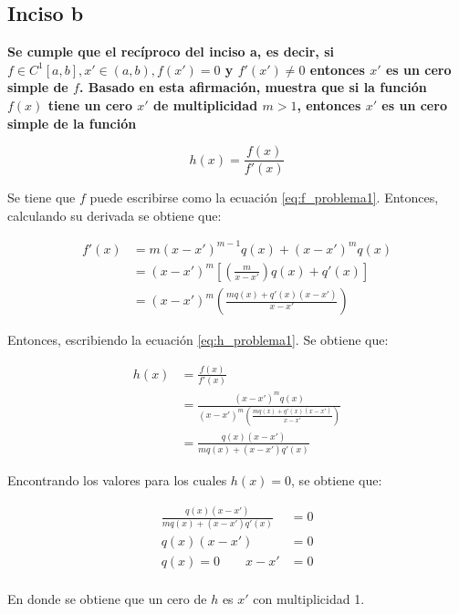 \subsection*{Inciso b}

\textbf{Se cumple que el recíproco del inciso a, es decir, si $f\in C^1[a,b], x' \in (a,b), f(x')=0$ y $f'(x')\neq 0$ entonces $x'$ es un cero simple de $f$. Basado en esta afirmación, muestra que si la función $f(x)$ tiene un cero $x'$ de multiplicidad $m>1$, entonces $x'$ es un cero simple de la función}

\begin{equation}
    h(x) = \frac{f(x)}{f'(x)} \label{eq:h_problema1}
\end{equation}

Se tiene que $f$ puede escribirse como la ecuación \ref{eq:f_problema1}. Entonces, calculando su derivada se obtiene que:

\begin{align*}
    f'(x) & = m(x-x')^{m-1} q(x) +(x-x')^mq(x)                                    \\
          & = (x-x')^{m}\left [  \left (\frac{m}{x-x'}\right ) q(x)+q'(x)\right ] \\
          & = (x-x')^m \left ( \frac{mq(x)+q'(x)(x-x')}{x-x'}\right )
\end{align*}

Entonces, escribiendo la ecuación \ref{eq:h_problema1}. Se obtiene que:

\begin{align*}
    h(x) & = \frac{f(x)}{f'(x)}                                                           \\
         & = \frac{(x-x')^mq(x)}{(x-x')^m \left ( \frac{mq(x)+q'(x)(x-x')}{x-x'}\right )} \\
         & = \frac{q(x)(x-x')}{mq(x)+(x-x')q'(x)}
\end{align*}

Encontrando los valores para los cuales $h(x)=0$, se obtiene que:

\begin{align*}
    \frac{q(x)(x-x')}{mq(x)+(x-x')q'(x)} & = 0 \\
    q(x)(x-x')                           & = 0 \\
    q(x) =0 \qquad x-x'                  & =0  \\
\end{align*}

En donde se obtiene que un cero de $h$ es $x'$ con multiplicidad 1.